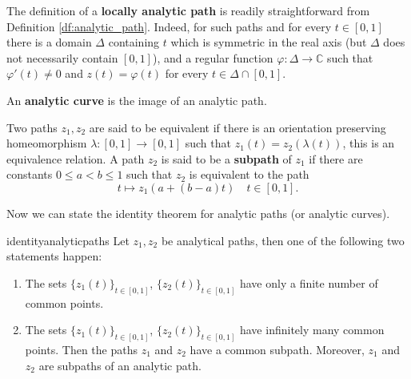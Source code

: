 The definition of a {\bf locally analytic path} is readily straightforward from Definition \ref{df:analytic_path}. Indeed, for such paths and for every $t\in [0,1]$ there is a domain $\Delta$ containing $t$ which is symmetric in the real axis (but $\Delta$ does not necessarily contain $[0,1]$), and a regular function $\varphi:\Delta \rightarrow \mathbb{C}$ such that $\varphi'(t)\neq 0$ and $z(t)=\varphi(t)$ for every $t\in \Delta \cap [0,1]$.

\begin{mydef}{}{}
An {\bf analytic curve} is the image of an analytic path.
\end{mydef}

\begin{mydef}{}{}
Two paths $z_1,z_2$ are said to be equivalent if there is an orientation preserving homeomorphism $\lambda:[0,1]\rightarrow [0,1]$ such that $z_1(t) = z_2(\lambda(t))$, this is an equivalence relation. A path $z_2$ is said to be a {\bf subpath} of $z_1$ if there are constants $0\leq a <b\leq 1$ such that $z_2$ is equivalent to the path
$$t\mapsto z_1(a+(b-a)t)\quad t\in[0,1].$$
\end{mydef}

Now we can state the identity theorem for analytic paths (or analytic curves). 

\begin{mytheo}{}{identityanalyticpaths}
Let $z_1,z_2$ be analytical paths, then one of the following two statements happen: 

\begin{enumerate}
\item The sets $\{z_1(t)\}_{t\in[0,1]}$, $\{z_2(t)\}_{t\in[0,1]}$ have only a finite number of common points.\\
\item The sets $\{z_1(t)\}_{t\in[0,1]}$, $\{z_2(t)\}_{t\in[0,1]}$ have infinitely many common points. Then the paths $z_1$ and $z_2$ have a common subpath. Moreover, $z_1$ and $z_2$ are subpaths of an analytic path.
\end{enumerate}
\end{mytheo}

